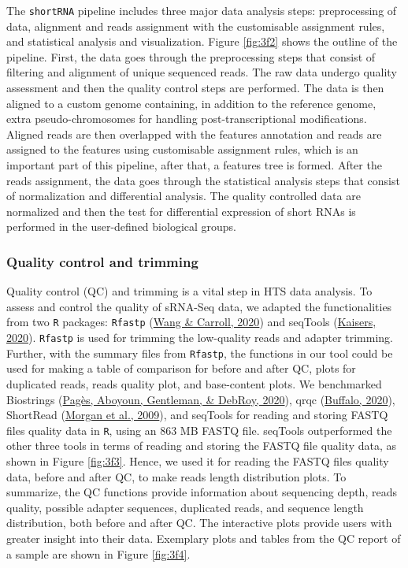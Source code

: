 \documentclass[12pt,twoside]{reedthesis}
\begin{document}
The \texttt{shortRNA} pipeline includes three major data analysis steps:
preprocessing of data, alignment and reads assignment with the
customisable assignment rules, and statistical analysis and
visualization. Figure \ref{fig:3f2} shows the outline of the pipeline. First, the
data goes through the preprocessing steps that consist of filtering and
alignment of unique sequenced reads. The raw data undergo quality
assessment and then the quality control steps are performed. The data is
then aligned to a custom genome containing, in addition to the reference
genome, extra pseudo-chromosomes for handling post-transcriptional
modifications. Aligned reads are then overlapped with the features
annotation and reads are assigned to the features using customisable
assignment rules, which is an important part of this pipeline, after
that, a features tree is formed. After the reads assignment, the data
goes through the statistical analysis steps that consist of
normalization and differential analysis. The quality controlled data are
normalized and then the test for differential expression of short RNAs
is performed in the user-defined biological groups.



\hypertarget{quality-control-and-trimming}{%
\subsubsection{Quality control and trimming}\label{quality-control-and-trimming}}

Quality control (QC) and trimming is a vital step in HTS data analysis.
To assess and control the quality of sRNA-Seq data, we adapted the
functionalities from two \texttt{R} packages: \texttt{Rfastp} (\protect\hyperlink{ref-wang2020}{Wang \& Carroll, 2020}) and seqTools
(\protect\hyperlink{ref-kaisers2020}{Kaisers, 2020}). \texttt{Rfastp} is used for trimming the low-quality reads and
adapter trimming. Further, with the summary files from \texttt{Rfastp}, the
functions in our tool could be used for making a table of comparison for
before and after QC, plots for duplicated reads, reads quality plot, and
base-content plots. We benchmarked Biostrings (\protect\hyperlink{ref-paguxe8s2020}{Pagès, Aboyoun, Gentleman, \& DebRoy, 2020}), qrqc
(\protect\hyperlink{ref-buffalo2020}{Buffalo, 2020}), ShortRead (\protect\hyperlink{ref-morgan2009}{Morgan et al., 2009}), and seqTools for reading and
storing FASTQ files quality data in \texttt{R}, using an 863 MB FASTQ file.
seqTools outperformed the other three tools in terms of reading and
storing the FASTQ file quality data, as shown in Figure \ref{fig:3f3}. Hence, we
used it for reading the FASTQ files quality data, before and after QC,
to make reads length distribution plots. To summarize, the QC functions
provide information about sequencing depth, reads quality, possible
adapter sequences, duplicated reads, and sequence length distribution,
both before and after QC. The interactive plots provide users with
greater insight into their data. Exemplary plots and tables from the QC
report of a sample are shown in Figure \ref{fig:3f4}.
\end{document}
